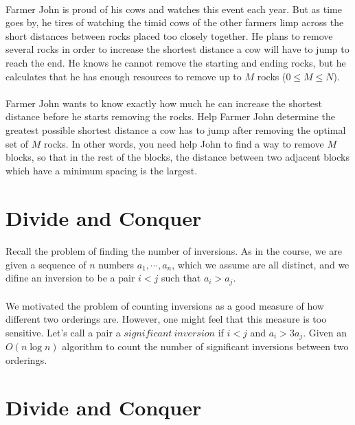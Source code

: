 \documentclass[a4paper,11pt]{article}
\begin{document}
\paragraph{}Farmer John is proud of his cows and watches this event each year. But as time goes by, he tires of watching the timid cows of the other farmers limp across the short distances between rocks placed too closely together. He plans to remove several rocks in order to increase the shortest distance a cow will have to jump to reach the end. He knows he cannot remove the starting and ending rocks, but he calculates that he has enough resources to remove up to $M$ rocks ($0 \leq M \leq N$).

\paragraph{}Farmer John wants to know exactly how much he can increase the shortest distance before he starts removing the rocks. Help Farmer John determine the greatest possible shortest distance a cow has to jump after removing the optimal set of $M$ rocks. In other words, you need help John to find a way to remove $M$ blocks, so that in the rest of the blocks, the distance between two adjacent blocks which have a minimum spacing is the largest.

\section{Divide and Conquer}

\paragraph{}Recall the problem of finding the number of inversions. As in the course, we are given a sequence of $n$ numbers $a_1,\cdots,a_n$, which we assume are all distinct, and we difine an inversion to be a pair $i<j$ such that $a_i>a_j$.

\paragraph{}We motivated the problem of counting inversions as a good measure of how different two orderings are. However, one might feel that this measure is too sensitive. Let's call a pair a $significant\ inversion$ if $i<j$ and $a_i>3a_j$. Given an $O(n\log n)$ algorithm to count the number of significant inversions between two orderings.

\section{Divide and Conquer}
\end{document}
